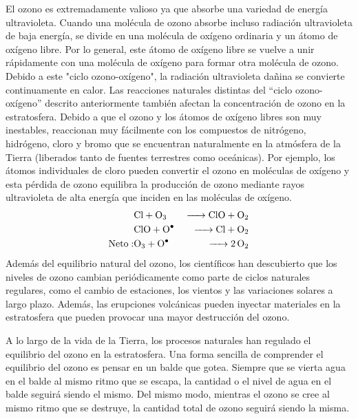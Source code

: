 El ozono es extremadamente valioso ya que absorbe una variedad de energía ultravioleta. Cuando una molécula de ozono absorbe incluso radiación ultravioleta de baja energía, se divide en una molécula de oxígeno ordinaria y un átomo de oxígeno libre. Por lo general, este átomo de oxígeno libre se vuelve a unir rápidamente con una molécula de oxígeno para formar otra molécula de ozono. Debido a este "ciclo ozono-oxígeno", la  radiación ultravioleta dañina se convierte continuamente en calor.
Las reacciones naturales distintas del ``ciclo ozono-oxígeno'' descrito anteriormente también afectan la concentración de ozono en la estratosfera. Debido a que el ozono y los átomos de oxígeno libres son muy inestables, reaccionan muy fácilmente con los compuestos de nitrógeno, hidrógeno, cloro y bromo que se encuentran naturalmente en la atmósfera de la Tierra (liberados tanto de fuentes terrestres como oceánicas). Por ejemplo, los átomos individuales de cloro pueden convertir el ozono en moléculas de oxígeno y esta pérdida de ozono equilibra la producción de ozono mediante rayos ultravioleta de alta energía que inciden en las moléculas de oxígeno.
\begin{eqnarray*}
 &\ce{Cl + O3 & -> ClO + O2  \\
 &ClO +  O^.  & -> Cl + O2 }\\ 
  \mathrm{Neto: } &\ce{O3 + O^.  &  -> 2O2}
\end{eqnarray*}
Además del equilibrio natural del ozono, los científicos han descubierto que los niveles de ozono cambian periódicamente como parte de ciclos naturales regulares, como el cambio de estaciones, los vientos y las variaciones solares a largo plazo. Además, las erupciones volcánicas pueden inyectar materiales en la estratosfera que pueden provocar una mayor destrucción del ozono.

A lo largo de la vida de la Tierra, los procesos naturales han regulado el equilibrio del ozono en la estratosfera. Una forma sencilla de comprender el equilibrio del ozono es pensar en un balde que gotea. Siempre que se vierta agua en el balde al mismo ritmo que se escapa, la cantidad o el nivel de agua en el balde seguirá siendo el mismo. Del mismo modo, mientras el ozono se cree al mismo ritmo que se destruye, la cantidad total de ozono seguirá siendo la misma.

